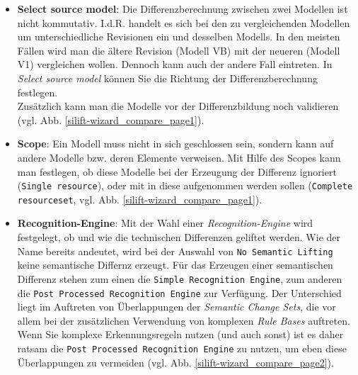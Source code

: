 \begin{itemize}

\item \textbf{Select source model}: Die Differenzberechnung zwischen zwei Modellen ist nicht kommutativ.
I.d.R. handelt es sich bei den zu vergleichenden Modellen um unterschiedliche Revisionen ein und desselben Modells.
In den meisten Fällen wird man die ältere Revision (Modell VB) mit der neueren (Modell V1) vergleichen wollen.
Dennoch kann auch der andere Fall eintreten.
In \textit{Select source model} können Sie die Richtung der Differenzberechnung festlegen.\\
Zusätzlich kann man die Modelle vor der Differenzbildung noch validieren (vgl. Abb. \ref{silift-wizard_compare_page1}).


\item \textbf{Scope}: Ein Modell muss nicht in sich geschlossen sein, sondern kann auf andere Modelle bzw. deren Elemente verweisen.
Mit Hilfe des Scopes kann man festlegen, ob diese Modelle bei der Erzeugung der Differenz ignoriert (\texttt{Single resource}), oder mit in diese aufgenommen werden sollen (\texttt{Complete resourceset}, vgl. Abb. \ref{silift-wizard_compare_page1}).


\item \textbf{Recognition-Engine}: Mit der Wahl einer \textit{Recognition-Engine} wird festgelegt, ob und wie die technischen Differenzen geliftet werden.
Wie der Name bereits andeutet, wird bei der Auswahl von \texttt{No Semantic Lifting} keine semantische Differnz erzeugt.
Für das Erzeugen einer semantischen Differenz stehen zum einen die \texttt{Simple Recognition Engine}, zum anderen die \texttt{Post Processed Recognition Engine} zur Verfügung.
Der Unterschied liegt im Auftreten von Überlappungen der \textit{Semantic Change Sets}, die vor allem bei der zusätzlichen Verwendung von komplexen \textit{Rule Bases} auftreten.
Wenn Sie komplexe Erkennungsregeln nutzen (und auch sonst) ist es daher ratsam die \texttt{Post Processed Recognition Engine} zu nutzen, um eben diese Überlappungen zu vermeiden (vgl. Abb. \ref{silift-wizard_compare_page2}).

\end{itemize}

